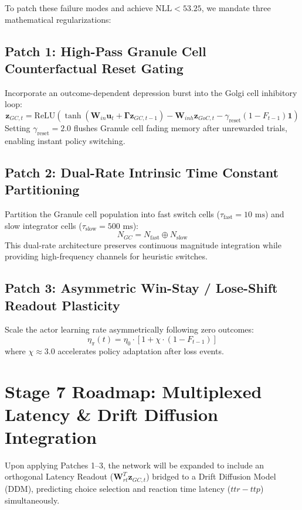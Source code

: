 \documentclass[11pt,a4paper]{article}
\begin{document}
To patch these failure modes and achieve $\text{NLL} < 53.25$, we mandate three mathematical regularizations:

\subsection{Patch 1: High-Pass Granule Cell Counterfactual Reset Gating}
Incorporate an outcome-dependent depression burst into the Golgi cell inhibitory loop:
\begin{equation}
\mathbf{z}_{GC,t} = \text{ReLU}\left( \tanh\left(\mathbf{W}_{in}\mathbf{u}_t + \boldsymbol{\Gamma}\mathbf{z}_{GC,t-1}\right) - \mathbf{W}_{inh}\mathbf{z}_{GoC,t} - \gamma_{\text{reset}} (1 - F_{t-1}) \mathbf{1} \right)
\end{equation}
Setting $\gamma_{\text{reset}} = 2.0$ flushes Granule cell fading memory after unrewarded trials, enabling instant policy switching.

\subsection{Patch 2: Dual-Rate Intrinsic Time Constant Partitioning}
Partition the Granule cell population into fast switch cells ($\tau_{\text{fast}} = 10\text{ ms}$) and slow integrator cells ($\tau_{\text{slow}} = 500\text{ ms}$):
\begin{equation}
N_{GC} = N_{\text{fast}} \oplus N_{\text{slow}}
\end{equation}
This dual-rate architecture preserves continuous magnitude integration while providing high-frequency channels for heuristic switches.

\subsection{Patch 3: Asymmetric Win-Stay / Lose-Shift Readout Plasticity}
Scale the actor learning rate asymmetrically following zero outcomes:
\begin{equation}
\eta_{\pi}(t) = \eta_0 \cdot \left[ 1 + \chi \cdot (1 - F_{t-1}) \right]
\end{equation}
where $\chi \approx 3.0$ accelerates policy adaptation after loss events.

\section{Stage 7 Roadmap: Multiplexed Latency \& Drift Diffusion Integration}

Upon applying Patches 1--3, the network will be expanded to include an orthogonal Latency Readout ($\mathbf{W}_{rt}^T \mathbf{z}_{GC,t}$) bridged to a Drift Diffusion Model (DDM), predicting choice selection and reaction time latency ($ttr - ttp$) simultaneously.
\end{document}
